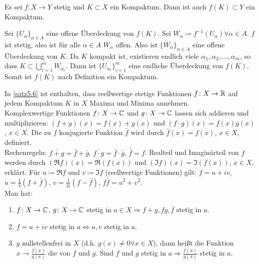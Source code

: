 \newpage
\begin{satz}
Es sei $ f\colon X\rightarrow Y $ stetig und $ K\subset X $ ein Kompaktum. Dann ist auch $ f(K)\subset Y $ ein Kompaktum.
\end{satz}
\begin{beweis}
Sei $ \lbrace U_\alpha\rbrace_{\alpha\in A} $ eine offene \"Uberdeckung von $ f(K) $. Sei $ W_\alpha\coloneqq f^{-1}(U_\alpha)\forall\alpha\in A $. $ f $ ist stetig, also ist f\"ur alle $ \alpha\in A $ $ W_\alpha $ offen. Also ist $ \lbrace W_\alpha\rbrace_{\alpha\in A} $ eine offene \"Uberdeckung von $ K $. Da $ K $ kompakt ist, existieren endlich viele $ \alpha_1,\alpha_2,...,\alpha_m $, so dass $ K\subset\bigcup_{i=1}^m W_{\alpha_i} $. Dann ist $ \lbrace U_{\alpha_i}\rbrace_{i=1}^m $ eine endliche \"Uberdeckung von $ f(K) $. Somit ist $ f(K) $ nach Definition ein Kompaktum. 
\end{beweis}
In \ref{satz5.6} ist enthalten, dass reellwertige stetige Funktionen $ f\colon X\rightarrow\mathbb{R} $ auf jedem Kompaktum $ K $ in $ X $ Maxima und Minima annehmen.\\
Komplexwertige Funktionen $ f\colon X\rightarrow\mathbb{C} $ und $ g\colon X\rightarrow\mathbb{C} $ lassen sich addieren und multiplizieren: $ (f+g)(x)=f(x)+g(x) $ und $ (f\cdot g)(x)=f(x)g(x) $, $ x\in X $. Die zu $ f $ konjugierte Funktion $ \bar f $ wird durch $ \bar f(x)=\overline{f(x)} $, $ x\in X $, definiert.\\
Rechenregeln: $ \overline{f+g}=\bar f+\bar g $, $ \overline{f\cdot g}=\bar f\cdot\bar g $, $ \bar{\bar f}=f $. Realteil und Imagin\"arteil von $ f $ werden durch $ (\Re f)(x)=\Re (f(x)) $ und $ (\Im f)(x)=\Im (f(x)) $, $ x\in X $, erklärt. F\"ur $ u\coloneqq\Re f $ und $ v\coloneqq \Im f $ (reellwertige Funktionen) gilt: $ f=u+iv $, $ u=\frac{1}{2}(f+\bar f) $, $ v=\frac{1}{2i}(f-\bar f) $, $ f\bar f=u^2+v^2 $.\\
Man hat:
\begin{enumerate}
\item $ f\colon X\rightarrow\mathbb{C} $, $ g\colon X\rightarrow\mathbb{C} $ stetig in $ a\in X \Rightarrow f+g, fg, \bar f$ stetig in $ a $.
\item $ f=u+iv $ stetig in $ a\Leftrightarrow u,v$ stetig in $ a $.
\item $ g $ nullstellenfrei in $ X $ (d.h. $ g(x)\neq 0\forall x\in X $), dann hei\ss t die Funktion $ x\rightarrow \frac{f(x)}{g(x)} $ die  von $ f $ und $ g $. Sind $ f $ und $ g $ stetig in $ a\Rightarrow\frac{f(x)}{g(x)} $ stetig in $ a $.
\end{enumerate}